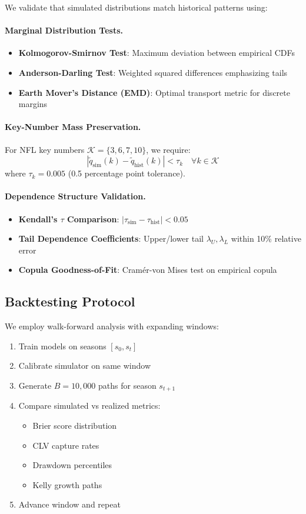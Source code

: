 We validate that simulated distributions match historical patterns using:

\paragraph{Marginal Distribution Tests.}
\begin{itemize}
  \item \textbf{Kolmogorov-Smirnov Test}: Maximum deviation between empirical CDFs
  \item \textbf{Anderson-Darling Test}: Weighted squared differences emphasizing tails
  \item \textbf{Earth Mover's Distance (EMD)}: Optimal transport metric for discrete margins
\end{itemize}

\paragraph{Key-Number Mass Preservation.}
For NFL key numbers $\mathcal{K} = \{3, 6, 7, 10\}$, we require:
\[
|\tilde{q}_{\text{sim}}(k) - \tilde{q}_{\text{hist}}(k)| < \tau_k \quad \forall k \in \mathcal{K}
\]
where $\tau_k = 0.005$ (0.5 percentage point tolerance).

\paragraph{Dependence Structure Validation.}
\begin{itemize}
  \item \textbf{Kendall's $\tau$ Comparison}: $|\tau_{\text{sim}} - \tau_{\text{hist}}| < 0.05$
  \item \textbf{Tail Dependence Coefficients}: Upper/lower tail $\lambda_U, \lambda_L$ within 10\% relative error
  \item \textbf{Copula Goodness-of-Fit}: Cramér-von Mises test on empirical copula
\end{itemize}

\subsection{Backtesting Protocol}

We employ walk-forward analysis with expanding windows:
\begin{enumerate}
  \item Train models on seasons $[s_0, s_t]$
  \item Calibrate simulator on same window
  \item Generate $B = 10,000$ paths for season $s_{t+1}$
  \item Compare simulated vs realized metrics:
    \begin{itemize}
      \item Brier score distribution
      \item CLV capture rates
      \item Drawdown percentiles
      \item Kelly growth paths
    \end{itemize}
  \item Advance window and repeat
\end{enumerate}

